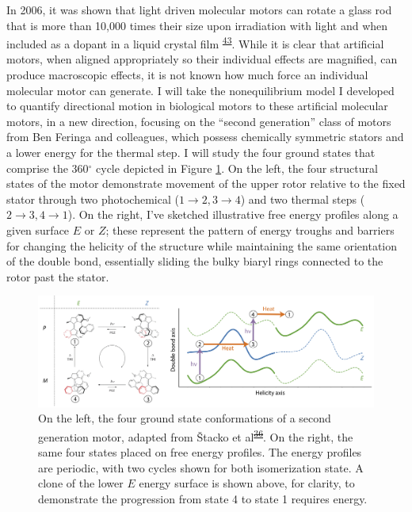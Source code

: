 \documentclass[11pt,notitlepage]{article}
\providecommand{\DIFaddtex}[1]{{\protect\color{blue}\uwave{#1}}} %
\providecommand{\DIFdeltex}[1]{{\protect\color{red}\sout{#1}}}                      %
\providecommand{\DIFaddbegin}{} %
\providecommand{\DIFaddend}{} %
\providecommand{\DIFdelbegin}{} %
\providecommand{\DIFdelend}{} %
\providecommand{\DIFaddFL}[1]{\DIFadd{#1}} %
\providecommand{\DIFdelFL}[1]{\DIFdel{#1}} %
\providecommand{\DIFaddbeginFL}{} %
\providecommand{\DIFaddendFL}{} %
\providecommand{\DIFdelbeginFL}{} %
\providecommand{\DIFdelendFL}{} %
\providecommand{\DIFadd}[1]{\texorpdfstring{\DIFaddtex{#1}}{#1}} %
\providecommand{\DIFdel}[1]{\texorpdfstring{\DIFdeltex{#1}}{}} %
\newcommand{\DIFscaledelfig}{0.5}
\newlength{\DIFdelgraphicswidth} %
\newlength{\DIFdelgraphicsheight} %
\newcommand{\DIFaddincludegraphics}[2][]{{\color{blue}\fbox{\DIFOincludegraphics[#1]{#2}}}} %
\newcommand{\DIFdelincludegraphics}[2][]{%
\sbox{\DIFdelgraphicsbox}{\DIFOincludegraphics[#1]{#2}}%
\settoboxwidth{\DIFdelgraphicswidth}{\DIFdelgraphicsbox} %
\settoboxtotalheight{\DIFdelgraphicsheight}{\DIFdelgraphicsbox} %
\scalebox{\DIFscaledelfig}{%
\parbox[b]{\DIFdelgraphicswidth}{\usebox{\DIFdelgraphicsbox}\\[-\baselineskip] \rule{\DIFdelgraphicswidth}{0em}}\llap{\resizebox{\DIFdelgraphicswidth}{\DIFdelgraphicsheight}{%
\setlength{\unitlength}{\DIFdelgraphicswidth}%
\begin{picture}(1,1)%
\thicklines\linethickness{2pt} %
{\color[rgb]{1,0,0}\put(0,0){\framebox(1,1){}}}%
{\color[rgb]{1,0,0}\put(0,0){\line( 1,1){1}}}%
{\color[rgb]{1,0,0}\put(0,1){\line(1,-1){1}}}%
\end{picture}%
}\hspace*{3pt}}} %
} %
\DeclareRobustCommand{\DIFaddbegin}{\DIFOaddbegin \let\includegraphics\DIFaddincludegraphics} %
\DeclareRobustCommand{\DIFaddend}{\DIFOaddend \let\includegraphics\DIFOincludegraphics} %
\DeclareRobustCommand{\DIFdelbegin}{\DIFOdelbegin \let\includegraphics\DIFdelincludegraphics} %
\DeclareRobustCommand{\DIFdelend}{\DIFOaddend \let\includegraphics\DIFOincludegraphics} %
\DeclareRobustCommand{\DIFaddbeginFL}{\DIFOaddbeginFL \let\includegraphics\DIFaddincludegraphics} %
\DeclareRobustCommand{\DIFaddendFL}{\DIFOaddendFL \let\includegraphics\DIFOincludegraphics} %
\DeclareRobustCommand{\DIFdelbeginFL}{\DIFOdelbeginFL \let\includegraphics\DIFdelincludegraphics} %
\DeclareRobustCommand{\DIFdelendFL}{\DIFOaddendFL \let\includegraphics\DIFOincludegraphics} %
\begin{document}
In 2006, it was shown that light driven molecular motors can rotate a
glass rod that is more than 10,000 times their size upon irradiation
with light and when included as a dopant in a liquid crystal
film\textsuperscript{\protect\DIFdelbegin %
\DIFdelend \DIFaddbegin \hyperlink{ref-thFGBz32}{43}\DIFaddend }. While it is
clear that artificial motors, when aligned appropriately so their
individual effects are magnified, can produce macroscopic effects, it is
not known how much force an individual molecular motor can generate. I
will take the nonequilibrium model I developed to quantify directional
motion in biological motors to these artificial molecular motors, in a
new direction, focusing on the ``second generation'' class of motors
from Ben Feringa and colleagues, which possess chemically symmetric
stators and a lower energy for the thermal step. I will study the four
ground states that comprise the 360\(^\circ\) cycle depicted in Figure
\ref{fig:motors}. On the left, the four structural states of the motor
demonstrate movement of the upper rotor relative to the fixed stator
through two photochemical (\(1 \rightarrow 2, 3 \rightarrow 4\)) and two
thermal steps (\(2 \rightarrow 3, 4 \rightarrow 1\)). On the right, I've
sketched illustrative free energy profiles along a given surface \(E\)
or \(Z\); these represent the pattern of energy troughs and barriers for
changing the helicity of the structure while maintaining the same
orientation of the double bond, essentially sliding the bulky biaryl
rings connected to the rotor past the stator.

\begin{figure}
\centering
\includegraphics[width=1\textwidth,height=\textheight]{content/images/offset-barriers.png}
\caption{On the left, the four ground state conformations of a second
generation motor, adapted from Štacko et
al\DIFdelbeginFL \DIFdelFL{\textsuperscript{\protect\hyperlink{ref-mKSNFvW7}{36}}}\DIFdelendFL \DIFaddbeginFL \DIFaddFL{\textsuperscript{\protect\hyperlink{ref-mKSNFvW7}{44}}}\DIFaddendFL . On the right,
the same four states placed on free energy profiles. The energy profiles
are periodic, with two cycles shown for both isomerization state. A
clone of the lower \(E\) energy surface is shown above, for clarity, to
demonstrate the progression from state 4 to state 1 requires
energy.\label{fig:motors}}
\end{figure}
\end{document}
